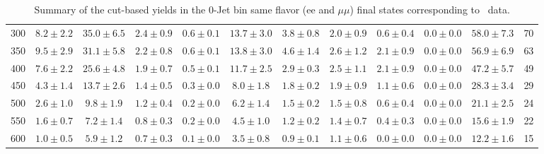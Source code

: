 \begin{table}
{\begin{center}
\begin{tabular}{l c c c c c c c c c c c }
300 & $8.2\pm2.2$ & $35.0\pm6.5$ & $2.4\pm0.9$ & $0.6\pm0.1$ & $13.7\pm3.0$ & $3.8\pm0.8$ & $2.0\pm0.9$ & $0.6\pm0.4$ & $0.0\pm0.0$ & $58.0\pm7.3$ & 70 \\
350 & $9.5\pm2.9$ & $31.1\pm5.8$ & $2.2\pm0.8$ & $0.6\pm0.1$ & $13.8\pm3.0$ & $4.6\pm1.4$ & $2.6\pm1.2$ & $2.1\pm0.9$ & $0.0\pm0.0$ & $56.9\pm6.9$ & 63 \\
400 & $7.6\pm2.2$ & $25.6\pm4.8$ & $1.9\pm0.7$ & $0.5\pm0.1$ & $11.7\pm2.5$ & $2.9\pm0.3$ & $2.5\pm1.1$ & $2.1\pm0.9$ & $0.0\pm0.0$ & $47.2\pm5.7$ & 49 \\
450 & $4.3\pm1.4$ & $13.7\pm2.6$ & $1.4\pm0.5$ & $0.3\pm0.0$ & $8.0\pm1.8$ & $1.8\pm0.2$ & $1.9\pm0.9$ & $1.1\pm0.6$ & $0.0\pm0.0$ & $28.3\pm3.4$ & 29 \\
500 & $2.6\pm1.0$ & $9.8\pm1.9$ & $1.2\pm0.4$ & $0.2\pm0.0$ & $6.2\pm1.4$ & $1.5\pm0.2$ & $1.5\pm0.8$ & $0.6\pm0.4$ & $0.0\pm0.0$ & $21.1\pm2.5$ & 24 \\
550 & $1.6\pm0.7$ & $7.2\pm1.4$ & $0.8\pm0.3$ & $0.2\pm0.0$ & $4.5\pm1.0$ & $1.2\pm0.2$ & $1.4\pm0.7$ & $0.4\pm0.3$ & $0.0\pm0.0$ & $15.6\pm1.9$ & 22 \\
600 & $1.0\pm0.5$ & $5.9\pm1.2$ & $0.7\pm0.3$ & $0.1\pm0.0$ & $3.5\pm0.8$ & $0.9\pm0.1$ & $1.1\pm0.6$ & $0.0\pm0.0$ & $0.0\pm0.0$ & $12.2\pm1.6$ & 15 \\
\hline
\end{tabular}
\end{center}
}
\caption{Summary of the cut-based yields in the 0-Jet bin same flavor (ee and $\mu\mu$) final states corresponding to \intlumi\ data.}
\end{table}
